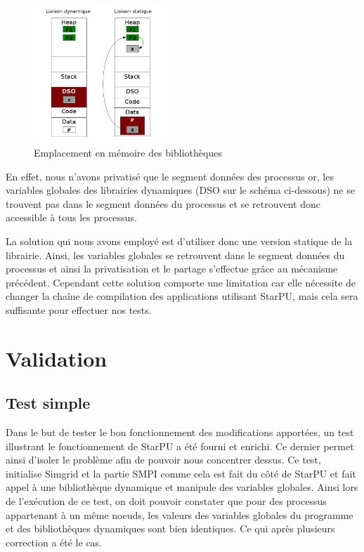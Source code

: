 \documentclass[smallextended]{svjour3}
\begin{document}
\begin{figure}[htb]
\centering
\includegraphics[width=5cm]{./Img/StaticDyn.jpg}
\caption{\label{fig:2}Emplacement en mémoire des bibliothèques}
\end{figure}

En effet, nous n'avons privatisé que le segment données des
processus or, les variables globales des librairies dynamiques (DSO
sur le schéma ci-dessous) ne se trouvent pas dans le segment données
du processus et se retrouvent donc accessible à tous les processus. 

La solution qui nous avons employé est d'utiliser donc une version
statique de la librairie. Ainsi, les variables globales se
retrouvent dans le segment données du processus et ainsi la
privatisation et le partage s'effectue grâce au mécanisme
précédent. Cependant cette solution comporte une limitation car elle
nécessite de changer la chaîne de compilation des applications
utilisant StarPU, mais cela sera suffisante pour effectuer nos tests. 

\section{Validation}
\label{sec-6}
\subsection{Test simple}
\label{sec-6-1}
Dans le but de tester le bon fonctionnement des modifications
apportées, un test illustrant le fonctionnement de StarPU a été
fourni et enrichi. Ce dernier permet ainsi d'isoler le problème
afin de pouvoir nous concentrer dessus. Ce test, initialise Simgrid
et la partie SMPI comme cela est fait du côté de StarPU et fait
appel à une bibliothèque dynamique et manipule des variables
globales. Ainsi lors de l'exécution de ce test, on doit pouvoir
constater que pour des processus appartenant à un même noeuds, les
valeurs des variables globales du programme et des bibliothèques
dynamiques sont bien identiques. Ce qui après plusieurs correction
a été le cas.  
\end{document}
